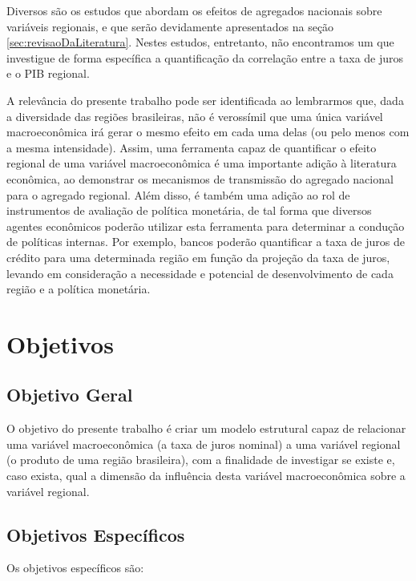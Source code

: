 \documentclass[12pt]{article}
\numberwithin{equation}{section}
\theoremstyle{definition}
\begin{document}
Diversos são os estudos que abordam os efeitos de agregados nacionais sobre variáveis regionais, e que serão devidamente apresentados na seção \ref{sec:revisaoDaLiteratura}. Nestes estudos, entretanto, não encontramos um que investigue de forma específica a quantificação da correlação entre a taxa de juros e o PIB regional.

A relevância do presente trabalho pode ser identificada ao lembrarmos que, dada a diversidade das regiões brasileiras, não é verossímil que uma única variável macroeconômica irá gerar o mesmo efeito em cada uma delas (ou pelo menos com a mesma intensidade). Assim, uma ferramenta capaz de quantificar o efeito regional de uma variável macroeconômica é uma importante adição à literatura econômica, ao demonstrar os mecanismos de transmissão do agregado nacional para o agregado regional. Além disso, é também uma adição ao rol de instrumentos de avaliação de política monetária, de tal forma que diversos agentes econômicos poderão utilizar esta ferramenta para determinar a condução de políticas internas. Por exemplo, bancos poderão quantificar a taxa de juros de crédito para uma determinada região em função da projeção da taxa de juros, levando em consideração a necessidade e potencial de desenvolvimento de cada região e a política monetária.

\newpage

\section{Objetivos}\label{sec:objetivos}

\subsection{Objetivo Geral}\label{subsec:objetivoGeral}

O objetivo do presente trabalho é criar um modelo estrutural capaz de relacionar uma variável macroeconômica (a taxa de juros nominal) a uma variável regional (o produto de uma região brasileira), com a finalidade de investigar se existe e, caso exista, qual a dimensão da influência desta variável macroeconômica sobre a variável regional.

\subsection{Objetivos Específicos}\label{subsec:objetivosEsp}

Os objetivos específicos são:
\end{document}
